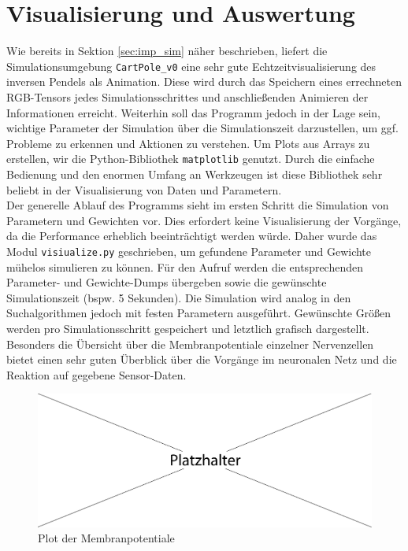 \section{Visualisierung und Auswertung}
\label{sec:imp_vis}
	Wie bereits in Sektion \ref{sec:imp_sim} näher beschrieben, liefert die Simulationsumgebung \texttt{CartPole\_v0} eine sehr gute Echtzeitvisualisierung des inversen Pendels als Animation. Diese wird durch das Speichern eines errechneten RGB-Tensors jedes Simulationsschrittes und anschließenden Animieren der Informationen erreicht. Weiterhin soll das Programm jedoch in der Lage sein, wichtige Parameter der Simulation über die Simulationszeit darzustellen, um ggf. Probleme zu erkennen und Aktionen zu verstehen. Um Plots aus Arrays zu erstellen, wir die Python-Bibliothek \texttt{matplotlib} genutzt. Durch die einfache Bedienung und den enormen Umfang an Werkzeugen ist diese Bibliothek sehr beliebt in der Visualisierung von Daten und Parametern.\\
	Der generelle Ablauf des Programms sieht im ersten Schritt die Simulation von Parametern und Gewichten vor. Dies erfordert keine Visualisierung der Vorgänge, da die Performance erheblich beeinträchtigt werden würde. Daher wurde das Modul \texttt{visiualize.py} geschrieben, um gefundene Parameter und Gewichte mühelos simulieren zu können. Für den Aufruf werden die entsprechenden Parameter- und Gewichte-Dumps übergeben sowie die gewünschte Simulationszeit (bspw. 5 Sekunden). Die Simulation wird analog in den Suchalgorithmen jedoch mit festen Parametern ausgeführt. Gewünschte Größen werden pro Simulationsschritt gespeichert und letztlich grafisch dargestellt. Besonders die Übersicht über die Membranpotentiale einzelner Nervenzellen bietet einen sehr guten Überblick über die Vorgänge im neuronalen Netz und die Reaktion auf gegebene Sensor-Daten.\\
%		
	\begin{figure}[!h] %
		\centering
		\includegraphics[width=12cm]{figures/sonstiges/platzhalter.pdf}
		\caption{Plot der Membranpotentiale }
		\label{fig:imp_plot_1}
	\end{figure}
